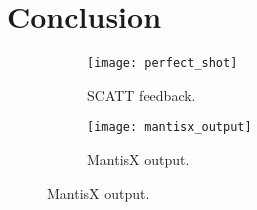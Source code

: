 \documentclass[conference]{IEEEtran}
\begin{document}
\section{Conclusion}




%
%





\begin{figure}[h]
	\begin{subfigure}{.5\textwidth}
		\centering
		\texttt{[image: perfect\_shot]}
		\caption{SCATT \cite{scatt} feedback.}
	\end{subfigure}
	\begin{subfigure}{.5\textwidth}
		\centering
		\texttt{[image: mantisx\_output]}
		\caption{MantisX output.}
	\end{subfigure}
\end{figure}




\clearpage


\end{document}
